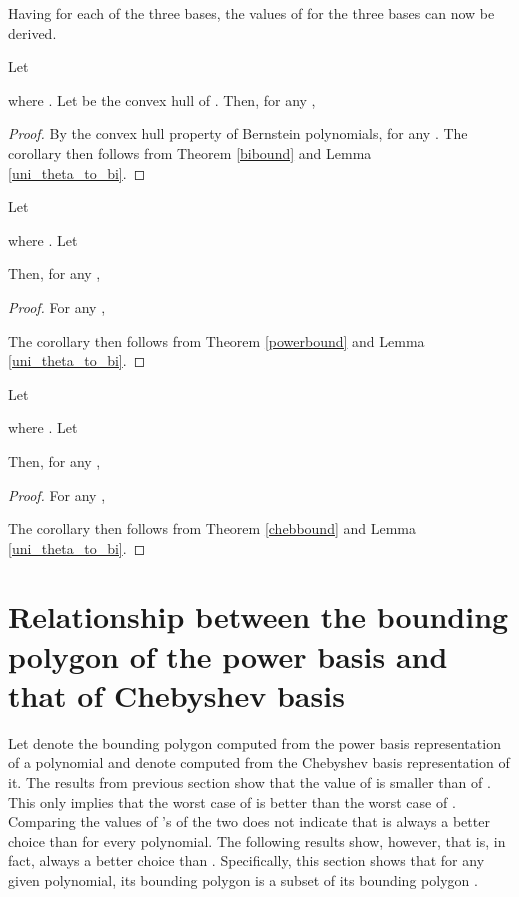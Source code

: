 \documentclass[12pt]{article}
\begin{document}
Having  for each of the three bases, the values of  for
the three bases can now be derived.

\begin{cor}
Let

where  .
Let  be the convex hull of . Then, for any ,

\end{cor}
\begin{proof}
By the convex hull property of Bernstein polynomials, 
for any .
The corollary then follows from Theorem \ref{bibound} and Lemma \ref{uni_theta_to_bi}.
\end{proof}

\begin{cor}
Let

where  .
Let

Then, for any ,

\end{cor}
\begin{proof}
For any ,

The corollary then follows from Theorem \ref{powerbound} and Lemma \ref{uni_theta_to_bi}.
\end{proof}

\begin{cor}
Let

where  .
Let

Then, for any ,

\end{cor}
\begin{proof}
For any ,

The corollary then follows from Theorem \ref{chebbound} and Lemma \ref{uni_theta_to_bi}.
\end{proof}

\section{Relationship between the bounding polygon of the power basis and that of Chebyshev basis}
\label{section_cheb_better_than_power} Let  denote the
bounding polygon  computed from the power basis
representation of a polynomial and  denote  computed
from the Chebyshev basis representation of it. The results from
previous section show that the value  of  is
smaller than  of . This only implies that the worst
case of  is better than the worst case of .
Comparing the values of 's of the two does not indicate
that  is always a better choice than  for every
polynomial.  The following results show, however, that  is,
in fact, always a better choice than . Specifically, this
section shows that for any given polynomial, its bounding polygon
 is a subset of its bounding polygon .
\end{document}
